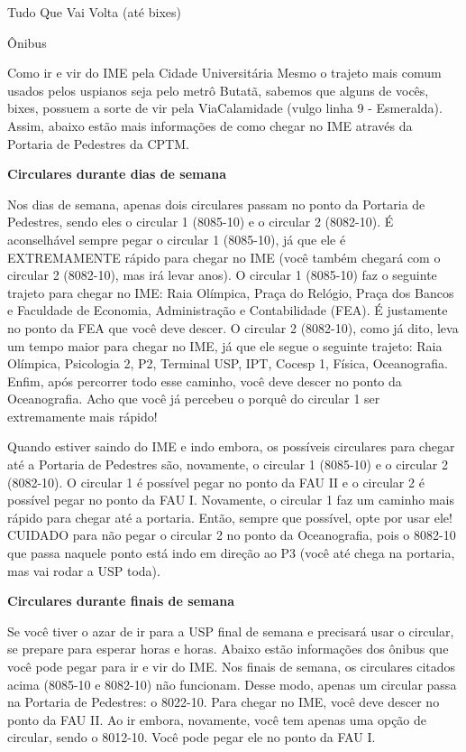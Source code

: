 \begin{secao}{Tudo Que Vai Volta (até bixes)}
\begin{subsecao}{Ônibus}
\begin{subsubsecao}{Como ir e vir do IME pela Cidade Universitária}
Mesmo o trajeto mais comum usados pelos uspianos seja pelo metrô Butatã, sabemos 
que alguns de vocês, bixes, possuem a sorte de vir pela ViaCalamidade 
(vulgo linha 9 - Esmeralda). 
Assim, abaixo estão mais informações de como chegar no IME através da Portaria de 
Pedestres da CPTM.

{\bf Circulares durante dias de semana}

Nos dias de semana, apenas dois circulares passam no ponto da Portaria de Pedestres,
sendo eles o circular 1 (8085-10) e o circular 2 (8082-10). É aconselhável sempre 
pegar o circular 1 (8085-10), já que ele é EXTREMAMENTE rápido para chegar no IME 
(você também chegará com o circular 2 (8082-10), mas irá levar anos).
O circular 1 (8085-10) faz o seguinte trajeto para chegar no IME: Raia Olímpica, 
Praça do Relógio, Praça dos Bancos e Faculdade de Economia, Administração e Contabilidade
(FEA). É justamente no ponto da FEA que você deve descer.
O circular 2 (8082-10), como já dito, leva um tempo maior para chegar no IME, já
que ele segue o seguinte trajeto: Raia Olímpica, Psicologia 2, P2, Terminal USP, IPT,
Cocesp 1, Física, Oceanografia. Enfim, após percorrer todo esse caminho, você deve 
descer no ponto da Oceanografia. Acho que você já percebeu o porquê do circular 1
ser extremamente mais rápido!

Quando estiver saindo do IME e indo embora, os possíveis circulares para chegar até a
Portaria de Pedestres são, novamente, o circular 1 (8085-10) e o circular 2 (8082-10).
O circular 1 é possível pegar no ponto da FAU II e o circular 2 é possível pegar no ponto
da FAU I. Novamente, o circular 1 faz um caminho mais rápido para chegar até a portaria. 
Então, sempre que possível, opte por usar ele! CUIDADO para não pegar o circular 2 no 
ponto da Oceanografia, pois o 8082-10 que passa naquele ponto está indo em direção ao P3
(você até chega na portaria, mas vai rodar a USP toda).


{\bf Circulares durante finais de semana}

Se você tiver o azar de ir para a USP final de semana e precisará usar o circular, se prepare
para esperar horas e horas. Abaixo estão informações dos ônibus que você pode pegar
para ir e vir do IME.
Nos finais de semana, os circulares citados acima (8085-10 e 8082-10) não funcionam. 
Desse modo, apenas um circular passa na Portaria de Pedestres: o 8022-10. 
Para chegar no IME, você deve descer no ponto da FAU II.
Ao ir embora, novamente, você tem apenas uma opção de circular, sendo o 
8012-10. Você pode pegar ele no ponto da FAU I. 


\end{subsubsecao}
\end{subsecao}
\end{secao}
